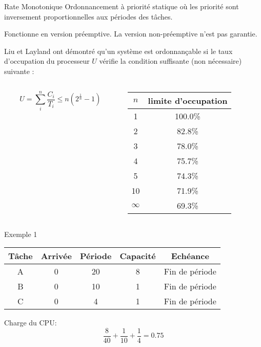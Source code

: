 \begin{frame}{Rate Monotonique}
  Ordonnancement à priorité statique où les priorité sont inversement
  proportionnelles aux périodes des tâches. 

  Fonctionne  en version préemptive.  La version  non-préemptive n'est
  pas garantie.

  Liu et Layland ont démontré qu'un système est ordonnançable si le
  taux d'occupation du processeur $U$ vérifie la condition suffisante
  (non nécessaire) suivante :

  \begin{columns}
    \begin{column}{5cm}
      $$U = \sum_i^n \frac{C_i}{T_i} ≤ n \left(2^{\frac{1}{n}}-1\right)$$
    \end{column}
    \begin{column}{5cm}
      \begin{center}
        \begin{tabular}{cc}
          \hline
          $n$ & limite d'occupation \\
          \hline
          1 & 100.0\% \\
          2 & 82.8\% \\
          3 & 78.0\% \\
          4 & 75.7\% \\
          5 & 74.3\% \\
          10 & 71.9\% \\
          $\infty$ & 69.3\%\\
          \hline
        \end{tabular}
      \end{center}
    \end{column}
  \end{columns}
\end{frame}

\begin{frame}{Exemple 1}
  \begin{center}
    \begin{tabular}{ccccc}
      \hline
      Tâche & Arrivée & Période & Capacité & Echéance \\
      \hline
      A & 0 & 20 & 8 & Fin de période\\
      B & 0 & 10 & 1 & Fin de période\\
      C & 0 &  4 & 1 & Fin de période\\
      \hline
    \end{tabular}
  \end{center}
  Charge du CPU:
  $$\frac{8}{40} + \frac{1}{10} + \frac{1}{4} = 0.75$$
\end{frame} 

